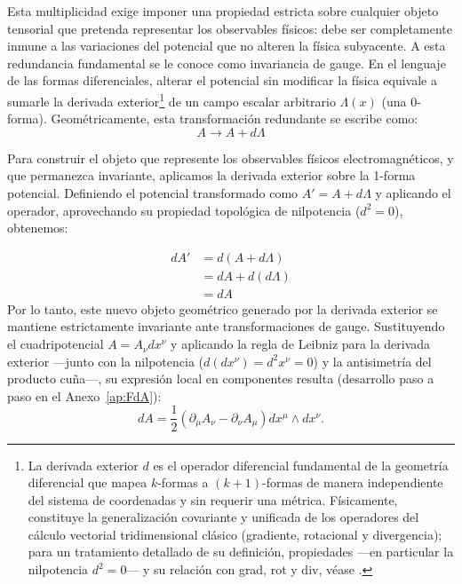 Esta multiplicidad exige imponer una propiedad estricta sobre cualquier objeto tensorial que pretenda representar los observables físicos: debe ser completamente inmune a las variaciones del potencial que no alteren la física subyacente. A esta redundancia fundamental se le conoce como invariancia de gauge. En el lenguaje de las formas diferenciales, alterar el potencial sin modificar la física equivale a sumarle la derivada exterior\footnote{La derivada exterior $d$ es el operador diferencial fundamental de la geometría diferencial que mapea $k$-formas a $(k+1)$-formas de manera independiente del sistema de coordenadas y sin requerir una métrica. Físicamente, constituye la generalización covariante y unificada de los operadores del cálculo vectorial tridimensional clásico (gradiente, rotacional y divergencia); para un tratamiento detallado de su definición, propiedades ---en particular la nilpotencia $d^2=0$--- y su relación con grad, rot y div, véase \parencite{bachman-2006, nakahara-2003}.} de un campo escalar arbitrario $\Lambda(x)$ (una 0-forma). Geométricamente, esta transformación redundante se escribe como:
\begin{equation}
    A \rightarrow A + d\Lambda
\end{equation}

Para construir el objeto que represente los observables físicos electromagnéticos, y que permanezca invariante, aplicamos la derivada exterior sobre la 1-forma potencial. Definiendo el potencial transformado como $A'= A + d\Lambda$ y aplicando el operador, aprovechando su propiedad topológica de nilpotencia ($d^2 = 0$), obtenemos:

\begin{align}
    dA' &= d(A + d\Lambda) \nonumber \\
        &= dA + d(d\Lambda) \nonumber \\
        &= dA
\end{align}
Por lo tanto, este nuevo objeto geométrico generado por la derivada exterior se mantiene estrictamente invariante ante transformaciones de gauge. Sustituyendo el cuadripotencial $A = A_\nu dx^\nu$ y aplicando la regla de Leibniz para la derivada exterior ---junto con la nilpotencia ($d(dx^\nu)=d^2x^\nu=0$) y la antisimetría del producto cuña---, su expresión local en componentes resulta (desarrollo paso a paso en el Anexo~\ref{ap:FdA}):
\begin{equation}
    dA = \frac{1}{2} (\partial_\mu A_\nu - \partial_\nu A_\mu) dx^\mu \wedge dx^\nu .
\end{equation}

